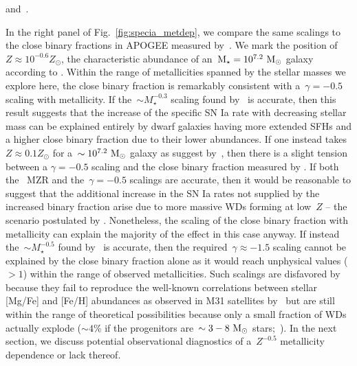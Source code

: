 \documentclass[ms.tex]{subfiles}
\begin{document}
\citet{Gallazzi2005} and~\citet{Kirby2013}.
\par
In the right panel of Fig.~\ref{fig:specia_metdep}, we compare the same
scalings to the close binary fractions in APOGEE measured by~\citet{Moe2019}.
We mark the position of~$Z \approx 10^{-0.6} Z_\odot$, the characteristic
abundance of an~$\text{M}_\star = 10^{7.2}~\text{M}_\odot$ galaxy according to
\citet{Zahid2014}.
Within the range of metallicities spanned by the stellar masses we explore here,
the close binary fraction is remarkably consistent with a~$\gamma = -0.5$
scaling with metallicity.
If the~$\sim M_\star^{-0.3}$ scaling found by~\citet{Gandhi2022} is accurate,
then this result suggests that the increase of the specific SN Ia rate with
decreasing stellar mass can be explained entirely by dwarf galaxies having more
extended SFHs and a higher close binary fraction due to their lower abundances.
If one instead takes~$Z \approx 0.1Z_\odot$ for a~$\sim10^{7.2}~\text{M}_\odot$ galaxy
as suggest by~\citet{Andrews2013}, then there is a slight tension between a
$\gamma = -0.5$ scaling and the close binary fraction measured by
\citet{Moe2019}.
If both the~\citet{Andrews2013} MZR and the~$\gamma = -0.5$ scalings are
accurate, then it would be reasonable to suggest that the additional increase
in the SN Ia rates not supplied by the increased binary fraction arise due to
more massive WDs forming at low~$Z$ -- the scenario postulated by
\citet{Kistler2013}.
Nonetheless, the scaling of the close binary fraction with metallicity can
explain the majority of the effect in this case anyway.
If instead the~$\sim M_\star^{-0.5}$ found by~\citet{Brown2019} is accurate,
then the required~$\gamma \approx -1.5$ scaling cannot be explained by the
close binary fraction alone as it would reach unphysical values ($>1$) within
the range of observed metallicities.
Such scalings are disfavored by~\citet{Gandhi2022} because they fail to
reproduce the well-known correlations between stellar [Mg/Fe] and [Fe/H]
abundances as observed in M31 satellites by~\citep*{Vargas2014} but are still
within the range of theoretical possibilities because only a small fraction of
WDs actually explode ($\sim4$\% if the progenitors are~$\sim3 - 8~\text{M}_\odot$
stars;~\citealp{Maoz2012b}).
In the next section, we discuss potential observational diagnostics of
a~$Z^{-0.5}$ metallicity dependence or lack thereof.
\end{document}
